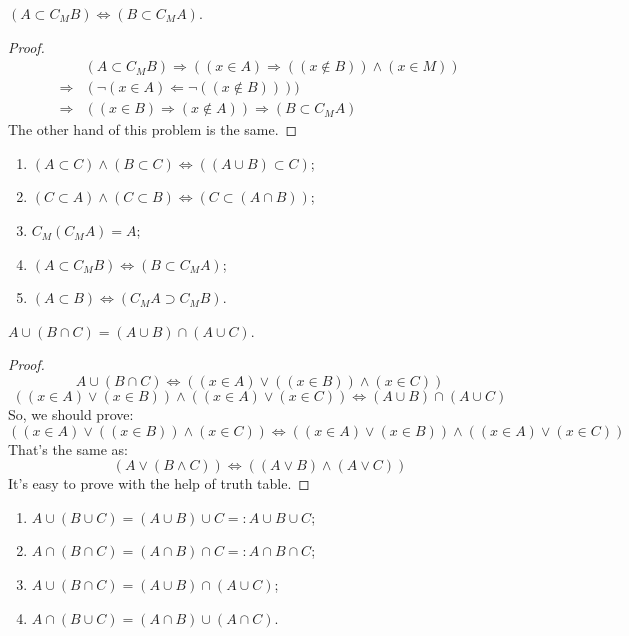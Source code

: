 \begin{question}
    $(A\subset C_{M}B)\Leftrightarrow (B\subset C_{M}A)$.
\end{question}
\begin{proof}
    \[\begin{aligned}
        &(A\subset C_{M}B)\Rightarrow ((x\in A)\Rightarrow((x\not\in B))\wedge(x\in M))\\ \Rightarrow& (\lnot(x\in A)\Leftarrow \lnot((x\not\in B))))\\
        \Rightarrow&((x\in B)\Rightarrow(x\not\in A))\Rightarrow(B\subset C_{M}A)
    \end{aligned}\]
    The other hand of this problem is the same.
\end{proof}
\begin{tips}
    \begin{enumerate}
        \item $(A\subset C)\wedge(B\subset C)\Leftrightarrow((A\cup B)\subset C)$;
        \item $(C\subset A)\wedge(C\subset B)\Leftrightarrow (C\subset(A\cap B))$;
        \item $C_{M}(C_{M}A)=A$;
        \item $(A\subset C_{M}B)\Leftrightarrow (B\subset C_{M}A)$;
        \item $(A\subset B)\Leftrightarrow(C_{M}A\supset C_{M}B)$.
    \end{enumerate}
\end{tips}
\begin{question}
    $A\cup (B\cap C)=(A\cup B)\cap (A\cup C)$.
\end{question}
\begin{proof}
    \[
        A\cup (B\cap C)\Leftrightarrow((x\in A)\vee ((x\in B))\wedge(x\in C))
    \]
    \[((x\in A)\vee(x\in B))\wedge((x\in A)\vee(x\in C))\Leftrightarrow(A\cup B)\cap (A\cup C)\]
    So, we should prove:
    \[((x\in A)\vee ((x\in B))\wedge(x\in C))\Leftrightarrow((x\in A)\vee(x\in B))\wedge((x\in A)\vee(x\in C))\]
    That's the same as:
    \[(A\vee(B\wedge C))\Leftrightarrow((A\vee B)\wedge(A\vee C))\]
    It's easy to prove with the help of truth table.
\end{proof}
\begin{tips}
    \begin{enumerate}
        \item $A\cup (B\cup C)=(A\cup B)\cup C=:A\cup B\cup C$;
        \item $A\cap (B\cap C)=(A\cap B)\cap C=:A\cap B\cap C$;
        \item $A\cup (B\cap C)=(A\cup B)\cap (A\cup C)$;
        \item $A\cap (B\cup C)=(A\cap B)\cup (A\cap C)$.
    \end{enumerate}
\end{tips}